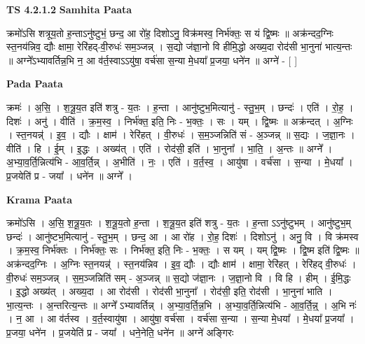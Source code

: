 \documentclass[17pt]{extarticle}
\begin{document}
\textbf{TS 4.2.1.2 } \newline
\textbf{Samhita Paata} \newline

क्रमो॑ऽसि शत्रूय॒तो ह॒न्ताऽनु॑ष्टुभं॒ छन्द॒ आ रो॑ह॒ दिशोऽनु॒ विक्र॑मस्व॒ निर्भ॑क्तः॒ स यं द्वि॒ष्मः ॥ अक्र॑न्दद॒ग्निः स्त॒नय॑न्निव॒ द्यौः क्षामा॒ रेरि॑हद्-वी॒रुधः॑ सम॒ञ्जन्न् । स॒द्यो ज॑ज्ञा॒नो वि हीमि॒द्धो अख्य॒दा रोद॑सी भा॒नुना॑ भात्य॒न्तः ॥ अग्ने᳚ऽभ्यावर्तिन्न॒भि न॒ आ व॑र्त॒स्वाऽऽयु॑षा॒ वर्च॑सा स॒न्या मे॒धया᳚ प्र॒जया॒ धने॑न ॥ अग्ने॑ - [  ] \newline

\textbf{Pada Paata} \newline

क्रमः॑ । अ॒सि॒ । श॒त्रू॒य॒त इति॑ शत्रु - य॒तः । ह॒न्ता । आनु॑ष्टुभ॒मित्यानु॑ - स्तु॒भ॒म् । छन्दः॑ । एति॑ । रो॒ह॒ । दिशः॑ । अनु॑ । वीति॑ । क्र॒म॒स्व॒ । निर्भ॑क्त॒ इति॒ निः - भ॒क्तः॒ । सः । यम् । द्वि॒ष्मः ॥ अक्र॑न्दत् । अ॒ग्निः । स्त॒नयन्न्॑ । इ॒व॒ । द्यौः । क्षाम॑ । रेरि॑हत् । वी॒रुधः॑ । स॒म॒ञ्जन्निति॑ सं - अ॒ञ्जन्न् ॥ स॒द्यः । ज॒ज्ञा॒नः । वीति॑ । हि । ई॒म् । इ॒द्धः । अख्य॑त् । एति॑ । रोद॑सी॒ इति॑ । भा॒नुना᳚ । भा॒ति॒ । अ॒न्तः ॥ अग्ने᳚ । अ॒भ्या॒व॒र्ति॒न्नित्य॑भि - आ॒व॒र्ति॒न्न् । अ॒भीति॑ । नः॒ । एति॑ । व॒र्त॒स्व॒ । आयु॑षा । वर्च॑सा । स॒न्या । मे॒धया᳚ । प्र॒जयेति॑ प्र - जया᳚ । धने॑न ॥ अग्ने᳚ ।  \newline


\textbf{Krama Paata} \newline

क्रमो॑ऽसि । अ॒सि॒ श॒त्रू॒य॒तः । श॒त्रू॒य॒तो ह॒न्ता । श॒त्रू॒य॒त इति॑ शत्रु - य॒तः । ह॒न्ता ऽऽनु॑ष्टुभम् । आनु॑ष्टुभ॒म् छन्दः॑ । आनु॑ष्टभ॒मित्यानु॑ - स्तु॒भ॒म् । छन्द॒ आ । आ रो॑ह । रो॒ह॒ दिशः॑ । दिशोऽनु॑ । अनु॒ वि । वि क्र॑मस्व । क्र॒म॒स्व॒ निर्भ॑क्तः । निर्भ॑क्तः॒ सः । निर्भ॑क्त॒ इति॒ निः - भ॒क्तः॒ । स यम् । यम् द्वि॒ष्मः । द्वि॒ष्म इति॑ द्वि॒ष्मः ॥ अक्र॑न्दद॒ग्निः । अ॒ग्निः स्त॒नयन्न्॑ । स्त॒नय॑न्निव । इ॒व॒ द्यौः । द्यौः क्षाम॑ । क्षामा॒ रेरि॑हत् । रेरि॑हद् वी॒रुधः॑ । वी॒रुधः॑ सम॒ञ्जन्न् । स॒म॒ञ्जन्निति॑ सम् - अ॒ञ्जन्न् ॥ स॒द्यो ज॑ज्ञा॒नः । ज॒ज्ञा॒नो वि । वि हि । हीम् । ई॒मि॒द्धः । इ॒द्धो अख्य॑त् । 
अख्य॒दा । आ रोद॑सी । रोद॑सी भा॒नुना᳚ । रोद॑सी॒ इति॒ रोद॑सी । 
भा॒नुना॑ भाति । भा॒त्य॒न्तः । अ॒न्तरित्य॒न्तः ॥ अग्ने᳚ ऽभ्यावर्तिन्न् । अ॒भ्या॒व॒र्ति॒न्न॒भि । अ॒भ्या॒व॒र्ति॒न्नित्य॑भि - आ॒व॒र्ति॒न्न्॒ । अ॒भि नः॑ । न॒ आ । आ व॑र्तस्व । व॒र्त॒स्वायु॑षा । आयु॑षा॒ वर्च॑सा । वर्च॑सा स॒न्या । स॒न्या मे॒धया᳚ । मे॒धया᳚ प्र॒जया᳚ । प्र॒जया॒ धने॑न । प्र॒जयेति॑ प्र - जया᳚ । धने॒नेति॒ धने॑न ॥ अग्ने॑ अङ्गिरः \newline
\end{document}
